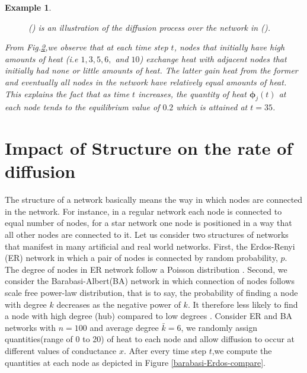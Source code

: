 \documentclass[10pt,a4paper]{article}
\newtheorem{exa}{Example}
\begin{document}
\begin{exa}
\begin{figure}[H]
\begin{subfigure}[b]{0.45\textwidth}
    	 			\caption{}
    	 			\label{difn-plot}
    	 		\end{subfigure}
    	 		\caption{() is an illustration of the diffusion process over the network in (). }
    	 		\label{graph-plot}
    	 	\end{figure}
     	  From Fig.\ref{graph-plot},we observe that at each time step $t$, nodes that initially have high amounts of heat (i.e $1,3,5,6,$ and $10$) exchange heat with adjacent nodes that initially had none or little amounts of heat. The latter gain heat from the former and eventually all nodes in the network have relatively equal amounts of heat. This explains the fact that as time $t$ increases, the quantity of heat $\boldsymbol{\phi}_j(t)$ at each node tends to the equilibrium value of $0.2$ which is attained at $t=35$. 
    	 \end{exa}
     
     \section{Impact of Structure on the rate of diffusion}
     The structure of a network basically means the way in which nodes are connected in the network. For instance, in a regular network each node is connected to equal number of nodes, for a star network one node is positioned in a way that all other nodes are connected to it.
     Let us consider two structures of networks that manifest in many artificial and real world networks.  First, the Erdos-Renyi (ER) network in which a pair of nodes is connected by random probability, $p$. The degree of nodes in ER network follow a Poisson distribution \cite{erdos1960evolution}. Second, we consider the Barabasi-Albert(BA) network in which connection of nodes follows scale free power-law distribution, that is to say, the probability of finding a node with degree $k$ decreases as the negative power of $k$. It therefore less likely to find a node with high degree (hub) compared to low degrees \cite{barabasi1999emergence, estrada2011structure} . 
     Consider ER and BA networks with $n=100$ and average degree $\bar{k}= 6$, we randomly assign quantities(range of 0 to 20) of heat to each node and allow diffusion to occur at different values of conductance $x$. After every time step $t$,we compute the quantities at each node as depicted in Figure \ref{barabasi-Erdos-compare}.
     
\end{document}
